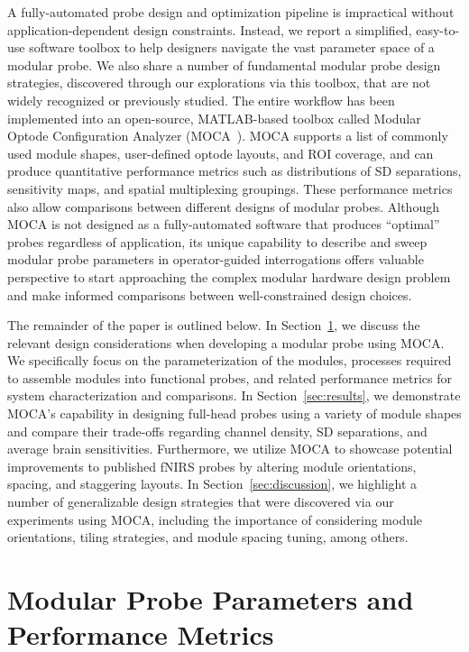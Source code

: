 A fully-automated probe design and optimization pipeline is impractical without application-dependent design constraints. Instead, we report a simplified, easy-to-use software toolbox to help designers navigate the vast parameter space of a modular probe. We also share a number of fundamental modular probe design strategies, discovered through our explorations via this toolbox, that are not widely recognized or previously studied. The entire workflow has been implemented into an open-source, MATLAB-based toolbox called Modular Optode Configuration Analyzer (MOCA~\cite{Vanegas2020}). \ac{MOCA} supports a list of commonly used module shapes, user-defined optode layouts, and \ac{ROI} coverage, and can produce quantitative performance metrics such as distributions of \ac{SD} separations, sensitivity maps, and spatial multiplexing groupings. These performance metrics also allow comparisons between different designs of modular probes. Although \ac{MOCA} is not designed as a fully-automated software that produces ``optimal'' probes regardless of application, its unique capability to describe and sweep modular probe parameters in operator-guided interrogations offers valuable perspective to start approaching the complex modular hardware design problem and make informed comparisons between well-constrained design choices.

The remainder of the paper is outlined below. In Section~\ref{sec:overview}, we discuss the relevant design considerations when developing a modular probe using \ac{MOCA}. We specifically focus on the parameterization of the modules, processes required to assemble modules into functional probes, and related performance metrics for system characterization and comparisons. In Section~\ref{sec:results}, we demonstrate \ac{MOCA}'s capability in designing full-head probes using a variety of module shapes and compare their trade-offs regarding channel density, \ac{SD} separations, and average brain sensitivities. Furthermore, we utilize \ac{MOCA} to showcase potential improvements to published \ac{fNIRS} probes by altering module orientations, spacing, and staggering layouts. In Section~\ref{sec:discussion}, we highlight a number of generalizable design strategies that were discovered via our experiments using \ac{MOCA}, including the importance of considering module orientations, tiling strategies, and module spacing tuning, among others.



\section{Modular Probe Parameters and Performance Metrics}
\label{sec:overview}

